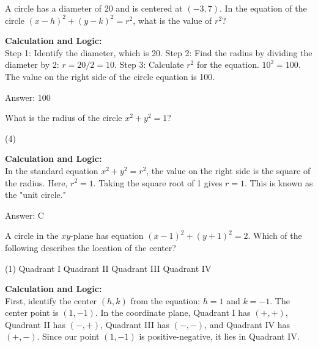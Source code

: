 \documentclass[11pt,paper=a4,answers]{exam}
\begin{document}
\begin{questions}
\question
A circle has a diameter of 20 and is centered at $(-3, 7)$. In the equation of the circle $(x - h)^2 + (y - k)^2 = r^2$, what is the value of $r^2$?

\begin{solution}
\textbf{Calculation and Logic:} \\
Step 1: Identify the diameter, which is 20. Step 2: Find the radius by dividing the diameter by 2: $r = 20 / 2 = 10$. Step 3: Calculate $r^2$ for the equation. $10^2 = 100$. The value on the right side of the circle equation is 100.

\vspace{30pt}

Answer: \colorbox{yellow!100}{100}
\end{solution}

\vspace{60pt}

\question
What is the radius of the circle $x^2 + y^2 = 1$?
\begin{tasks}(4)
\end{tasks}

\begin{solution}
\textbf{Calculation and Logic:} \\
In the standard equation $x^2 + y^2 = r^2$, the value on the right side is the square of the radius. Here, $r^2 = 1$. Taking the square root of 1 gives $r = 1$. This is known as the "unit circle."

\vspace{30pt}

Answer: \colorbox{yellow!100}{C}
\end{solution}

\vspace{60pt}

\question
A circle in the $xy$-plane has equation $(x - 1)^2 + (y + 1)^2 = 2$. Which of the following describes the location of the center?
\begin{tasks}(1)
    \task Quadrant I
    \task Quadrant II
    \task Quadrant III
    \task Quadrant IV
\end{tasks}

\begin{solution}
\textbf{Calculation and Logic:} \\
First, identify the center $(h, k)$ from the equation: $h = 1$ and $k = -1$. The center point is $(1, -1)$. In the coordinate plane, Quadrant I has $(+, +)$, Quadrant II has $(-, +)$, Quadrant III has $(-, -)$, and Quadrant IV has $(+, -)$. Since our point $(1, -1)$ is positive-negative, it lies in Quadrant IV.


\end{solution}
\end{questions}
\end{document}
